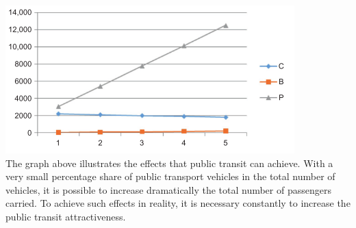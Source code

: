 \includegraphics[scale=0.8]{gfx/fig17.png}\\
%
The graph above illustrates the effects that public transit can achieve. With a very small percentage share of public transport vehicles in the total number of vehicles, it is possible to increase dramatically the total number of passengers carried. To achieve such effects in reality, it is necessary constantly to increase the public transit attractiveness.
%

